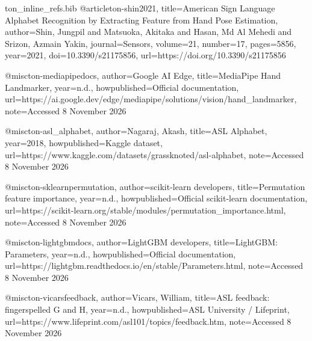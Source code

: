 
\begin{filecontents*}[overwrite]{ton_inline_refs.bib}
@article{ton-shin2021,
  title={American Sign Language Alphabet Recognition by Extracting Feature from Hand Pose Estimation},
  author={Shin, Jungpil and Matsuoka, Akitaka and Hasan, Md Al Mehedi and Srizon, Azmain Yakin},
  journal={Sensors},
  volume={21},
  number={17},
  pages={5856},
  year={2021},
  doi={10.3390/s21175856},
  url={https://doi.org/10.3390/s21175856}
}

@misc{ton-mediapipedocs,
  author={{Google AI Edge}},
  title={{MediaPipe} Hand Landmarker},
  year={n.d.},
  howpublished={Official documentation},
  url={https://ai.google.dev/edge/mediapipe/solutions/vision/hand_landmarker},
  note={Accessed 8 November 2026}
}

@misc{ton-asl_alphabet,
  author={Nagaraj, Akash},
  title={{ASL} Alphabet},
  year={2018},
  howpublished={Kaggle dataset},
  url={https://www.kaggle.com/datasets/grassknoted/asl-alphabet},
  note={Accessed 8 November 2026}
}

@misc{ton-sklearnpermutation,
  author={{scikit-learn developers}},
  title={Permutation feature importance},
  year={n.d.},
  howpublished={Official scikit-learn documentation},
  url={https://scikit-learn.org/stable/modules/permutation_importance.html},
  note={Accessed 8 November 2026}
}

@misc{ton-lightgbmdocs,
  author={{LightGBM developers}},
  title={{LightGBM}: Parameters},
  year={n.d.},
  howpublished={Official documentation},
  url={https://lightgbm.readthedocs.io/en/stable/Parameters.html},
  note={Accessed 8 November 2026}
}

@misc{ton-vicarsfeedback,
  author={Vicars, William},
  title={{ASL} feedback: fingerspelled {G} and {H}},
  year={n.d.},
  howpublished={{ASL University / Lifeprint}},
  url={https://www.lifeprint.com/asl101/topics/feedback.htm},
  note={Accessed 8 November 2026}
}
\end{filecontents*}

\documentclass{article}

\usepackage{microtype}
\usepackage{graphicx}

\usepackage{booktabs} %
\usepackage{hyperref}
\hypersetup{hypertexnames=false}

